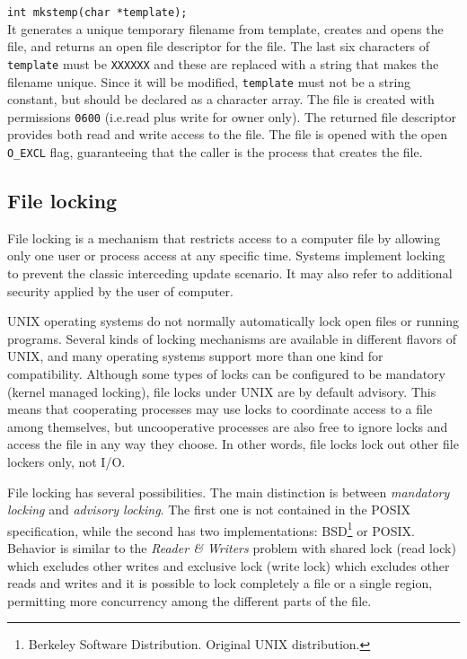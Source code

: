 \texttt{int mkstemp(char *template);}
\\
It generates a unique temporary filename from template, creates and opens the file, and returns an open file descriptor for the file. The last six characters of \texttt{template} must be \texttt{XXXXXX} and these are replaced with a string that makes the filename unique. Since it will be modified, \texttt{template} must not be a string constant, but should be declared as a character array. The file is created with permissions \texttt{0600} (i.e.\@ read plus write for owner only). The returned file descriptor provides both read and write access to the file. The file is opened with the open \texttt{O\_EXCL} flag, guaranteeing that the caller is the process that creates the file.

\subsection{File locking}
File locking is a mechanism that restricts access to a computer file by allowing only one user or process access at any specific time. Systems implement locking to prevent the classic interceding update scenario. It may also refer to additional security applied by the user of computer.

UNIX operating systems do not normally automatically lock open files or running programs. Several kinds of locking mechanisms are available in different flavors of UNIX, and many operating systems support more than one kind for compatibility. Although some types of locks can be configured to be mandatory (kernel managed locking), file locks under UNIX are by default advisory. This means that cooperating processes may use locks to coordinate access to a file among themselves, but uncooperative processes are also free to ignore locks and access the file in any way they choose. In other words, file locks lock out other file lockers only, not I/O.

File locking has several possibilities. The main distinction is between \emph{mandatory locking} and \emph{advisory locking}. The first one is not contained in the POSIX specification, while the second has two implementations: BSD\footnote{Berkeley Software Distribution. Original UNIX distribution.} or POSIX. Behavior is similar to the \emph{Reader \& Writers} problem with shared lock (read lock) which excludes other writes and exclusive lock (write lock) which excludes other reads and writes and it is possible to lock completely a file or a single region, permitting more concurrency among the different parts of the file.

